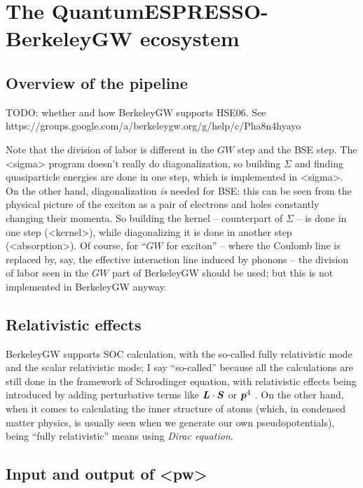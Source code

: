 \documentclass[hyperref, a4paper, 12pt]{report}
\def\texttt#1{<#1>}%
\newcommand{\shortcode}[1]{\texttt{#1}}
\begin{document}
\chapter{The QuantumESPRESSO-BerkeleyGW ecosystem}

\section{Overview of the pipeline}

TODO: whether and how BerkeleyGW supports HSE06.
See https://groups.google.com/a/berkeleygw.org/g/help/c/Pha8n4hyayo

Note that the division of labor is different in the $GW$ step and the BSE step.
The \shortcode{sigma} program doesn't really do diagonalization,
so building $\Sigma$ and finding quasiparticle energies 
are done in one step, which is implemented in \shortcode{sigma}.
On the other hand, 
diagonalization \emph{is} needed for BSE: 
this can be seen from the physical picture of the exciton
as a pair of electrons and holes constantly changing their momenta.
So building the kernel -- counterpart of $\Sigma$ -- 
is done in one step (\shortcode{kernel}),
while diagonalizing it is done in another step (\shortcode{absorption}).
Of course, for ``$GW$ for exciton'' -- 
where the Coulomb line is replaced by, say, 
the effective interaction line induced by phonons --
the division of labor seen in the $GW$ part of BerkeleyGW should be used; 
but this is not implemented in BerkeleyGW anyway.

\section{Relativistic effects}

BerkeleyGW supports SOC calculation, 
with the so-called fully relativistic mode 
and the scalar relativistic mode;
I say ``so-called'' because all the calculations are still done 
in the framework of Schrodinger equation,
with relativistic effects being introduced by 
adding perturbative terms like $\vb*{L} \cdot \vb*{S}$ or $\vb*{p}^4$ \cite{barker2022spinor}.
On the other hand, when it comes to calculating the inner structure of atoms 
(which, in condensed matter physics,
is usually seen when we generate our own pseudopotentials),
being ``fully relativistic'' means using \emph{Dirac equation}.

\section{Input and output of \shortcode{pw}}
\end{document}
